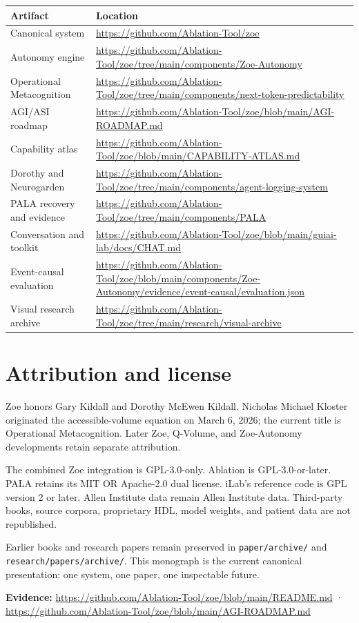 \documentclass[11pt]{article}
\newcommand{\evidence}[1]{\par\smallskip\small\color{ZoeGray}\textbf{Evidence:} #1\normalsize\par\smallskip}
\begin{document}
\begin{longtable}{p{}p{}}
\toprule
\textbf{Artifact} & \textbf{Location}\\
\midrule
Canonical system & \url{https://github.com/Ablation-Tool/zoe}\\
Autonomy engine & \url{https://github.com/Ablation-Tool/zoe/tree/main/components/Zoe-Autonomy}\\
Operational Metacognition & \url{https://github.com/Ablation-Tool/zoe/tree/main/components/next-token-predictability}\\
AGI/ASI roadmap & \url{https://github.com/Ablation-Tool/zoe/blob/main/AGI-ROADMAP.md}\\
Capability atlas & \url{https://github.com/Ablation-Tool/zoe/blob/main/CAPABILITY-ATLAS.md}\\
Dorothy and Neurogarden & \url{https://github.com/Ablation-Tool/zoe/tree/main/components/agent-logging-system}\\
PALA recovery and evidence & \url{https://github.com/Ablation-Tool/zoe/tree/main/components/PALA}\\
Conversation and toolkit & \url{https://github.com/Ablation-Tool/zoe/blob/main/guiai-lab/docs/CHAT.md}\\
Event-causal evaluation & \url{https://github.com/Ablation-Tool/zoe/blob/main/components/Zoe-Autonomy/evidence/event-causal/evaluation.json}\\
Visual research archive & \url{https://github.com/Ablation-Tool/zoe/tree/main/research/visual-archive}\\
\bottomrule
\end{longtable}

\clearpage
\section{Attribution and license}

Zoe honors Gary Kildall and Dorothy McEwen Kildall. Nicholas Michael Kloster originated the accessible-volume equation on March 6, 2026; the current title is Operational Metacognition. Later Zoe, Q-Volume, and Zoe-Autonomy developments retain separate attribution.

The combined Zoe integration is GPL-3.0-only. Ablation is GPL-3.0-or-later. PALA retains its MIT OR Apache-2.0 dual license. iLab's reference code is GPL version 2 or later. Allen Institute data remain Allen Institute data. Third-party books, source corpora, proprietary HDL, model weights, and patient data are not republished.

Earlier books and research papers remain preserved in \texttt{paper/archive/} and \texttt{research/papers/archive/}. This monograph is the current canonical presentation: one system, one paper, one inspectable future.

\evidence{\url{https://github.com/Ablation-Tool/zoe/blob/main/README.md} · \url{https://github.com/Ablation-Tool/zoe/blob/main/AGI-ROADMAP.md}}
\end{document}
